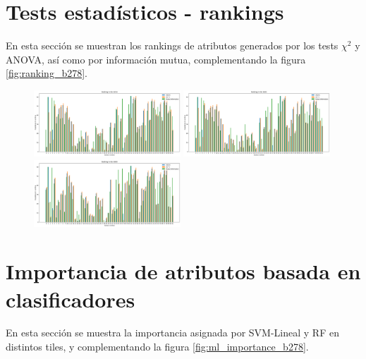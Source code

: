 \begin{appendix}
\newpage

\section{Tests estadísticos - rankings}
\label{anexo_b_rankings}
 En esta sección se muestran los rankings de atributos generados por los tests $\chi^2$ y ANOVA, así como por información mutua, complementando la figura \ref{fig:ranking_b278}.
 
\begin{figure}[h!]
\centering
  \includegraphics[width=0.49\textwidth]{Kap6/test=b234_variable_importance_ranking.png} 
  \includegraphics[width=0.49\textwidth]{Kap6/test=b261_variable_importance_ranking.png}  \\
  \includegraphics[width=0.49\textwidth]{Kap6/test=b360_variable_importance_ranking.png} 
\end{figure}

\section{Importancia de atributos basada en clasificadores}
\label{anexo_ml_scores}
 En esta sección se muestra la importancia asignada por SVM-Lineal y RF en distintos tiles, y complementando la figura \ref{fig:ml_importance_b278}.
 

\end{appendix}
